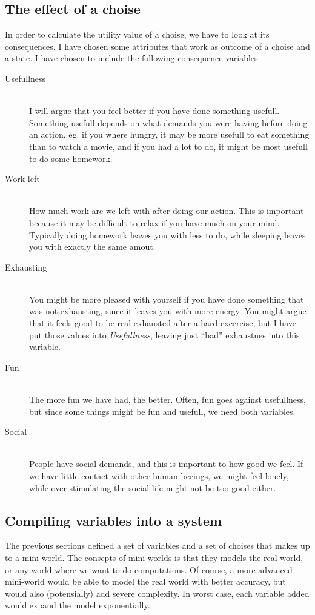 \subsection{The effect of a choise}
In order to calculate the utility value of a choise, we have to
look at its consequences. I have chosen some attributes that work as outcome of a choise and
a state. I have chosen to include the following consequence variables:
\begin{description}
\item[Usefullness] \hfill\\
I will argue that you feel better if you have done something usefull. Something
usefull depends on what demands you were having before doing an action, eg. if
you where hungry, it may be more usefull to eat something than to watch a movie,
and if you had a lot to do, it might be most usefull to do some homework.

\item[Work left] \hfill\\
How much work are we left with after doing our action. This is important because
it may be difficult to relax if you have much on your mind. Typically doing
homework leaves you with less to do, while sleeping leaves you with exactly the
same amout.

\item[Exhausting] \hfill\\
You might be more pleased with yourself if you have done something that was not
exhausting, since it leaves you with more energy. You might argue that it feels
good to be real exhausted after a hard excercise, but I have put those values
into \emph{Usefullness}, leaving just ``bad'' exhaustnes into this variable.

\item[Fun] \hfill\\
The more fun we have had, the better. Often, fun goes against usefullness, but
since some things might be fun and usefull, we need both variables.

\item[Social] \hfill\\
People have social demands, and this is important to how good we feel. If we
have little contact with other human beeings, we might feel lonely, while
over-stimulating the social life might not be too good either. 

\end{description}

\subsection{Compiling variables into a system}
The previous sections defined a set of variables and a set of choises that
makes up to a mini-world. The consepts of mini-worlds is that they models the
real world, or any world where we want to do computations. Of course, a more
advanced mini-world would be able to model the real world with better accuracy,
but would also (potensially) add severe complexity. In worst case, each variable
added would expand the model exponentially.

